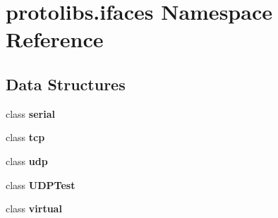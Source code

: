 \section{protolibs.\+ifaces Namespace Reference}
\label{namespaceprotolibs_1_1ifaces}
\subsection*{Data Structures}
\begin{DoxyCompactItemize}
\item 
class {\bf serial}
\item 
class {\bf tcp}
\item 
class {\bf udp}
\item 
class {\bf U\+D\+P\+Test}
\item 
class {\bf virtual}
\end{DoxyCompactItemize}
